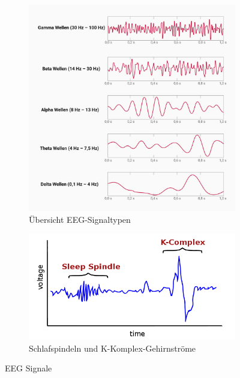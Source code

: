 \documentclass[a4paper, 12pt]{article}
\begin{document}
\begin{figure}[H]
    \centering
    \begin{subfigure}{0.4\textwidth}
        \centering
        \includegraphics[width=\textwidth]{eeg-baender_lg.jpg}
        \caption{Übersicht EEG-Signaltypen \cite{pic_eeg}}
        \label{EEG_pic}
    \end{subfigure}
    \hfill
    \begin{subfigure}{0.45\textwidth}
        \centering
        \includegraphics[width=\textwidth]{schlapfspindel_k_komplex.png}
        \caption{Schlafspindeln und K-Komplex-Gehirnströme \cite{pic_spin_k_komp}}
        \label{spind_k_pic}
    \end{subfigure}
    \caption{EEG Signale}
\end{figure}
\end{document}
